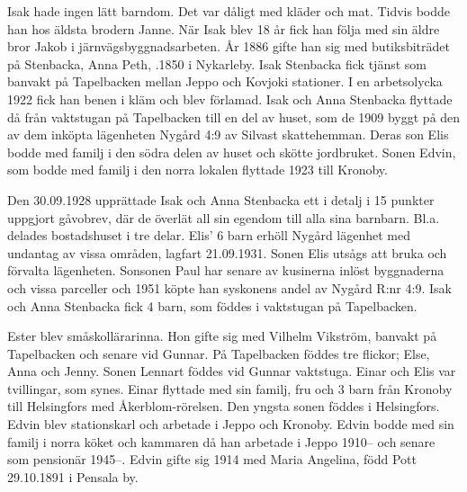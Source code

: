 Isak hade ingen lätt barndom. Det var dåligt med kläder och mat. Tidvis bodde han hos äldsta brodern Janne. När Isak blev 18 år fick han följa med sin äldre bror Jakob i järnvägsbyggnadsarbeten. År 1886 gifte han sig med butiksbiträdet på Stenbacka, Anna Peth, .1850 i Nykarleby. Isak Stenbacka fick tjänst som banvakt på Tapelbacken mellan Jeppo och Kovjoki stationer. I en arbetsolycka 1922 fick han benen i kläm och blev förlamad. Isak och Anna Stenbacka flyttade då från vaktstugan på Tapelbacken till en del av huset, som de 1909 byggt på den av dem inköpta lägenheten Nygård 4:9 av Silvast skattehemman.  Deras son Elis bodde med familj i den södra delen av huset och skötte jordbruket. Sonen Edvin, som bodde med familj i den norra lokalen flyttade 1923 till Kronoby.

Den 30.09.1928 upprättade Isak och Anna Stenbacka ett i detalj i 15 punkter uppgjort gåvobrev, där de överlät all sin egendom till alla sina barnbarn.  Bl.a. delades bostadshuset i tre delar. Elis' 6 barn erhöll Nygård lägenhet med undantag av vissa områden, lagfart 21.09.1931. Sonen Elis utsågs att bruka och förvalta lägenheten. Sonsonen Paul har senare av kusinerna inlöst byggnaderna och vissa parceller och 1951 köpte han syskonens andel av Nygård R:nr 4:9.
Isak och Anna Stenbacka fick 4 barn, som föddes i vaktstugan på Tapelbacken.
\begin{jhchildren}
  \item {}
  \item {}
  \item {}
  \item {}
\end{jhchildren}
Ester blev småskollärarinna. Hon gifte sig med Vilhelm Vikström, banvakt på Tapelbacken och senare vid Gunnar. På Tapelbacken föddes tre flickor; Else, Anna och Jenny. Sonen Lennart föddes vid Gunnar vaktstuga.
Einar och Elis var tvillingar, som synes. Einar flyttade med sin familj, fru och 3 barn från Kronoby till Helsingfors med Åkerblom-rörelsen. Den yngsta sonen föddes i Helsingfors. Edvin blev stationskarl och arbetade i Jeppo och Kronoby. Edvin bodde med sin familj i norra köket och kammaren då han arbetade i Jeppo 1910-- och senare som pensionär 1945--. Edvin gifte sig 1914 med Maria Angelina, född Pott 29.10.1891 i Pensala by.
